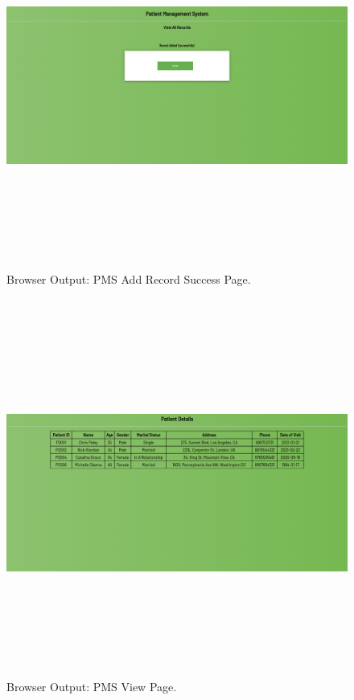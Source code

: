 \documentclass[12pt, a4]{article}
\begin{document}
\subsection*{}
\begin{figure}[h]
\centering
\caption{Browser Output: PMS Add Record Success Page.}
\includegraphics[height=12cm, width=16cm]{Output/PMSAddDone.png}
\end{figure}

\newpage
\subsection*{}
\begin{figure}[h]
\centering
\caption{Browser Output: PMS View Page.}
\includegraphics[height=12cm, width=16cm]{Output/PMSView1.png}
\end{figure}
\end{document}
